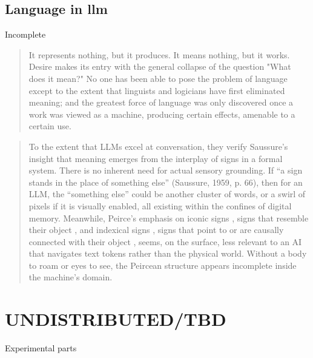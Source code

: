 \subsection{Language in \Gls{llm} }
\begin{orangebox}
	Incomplete
\end{orangebox}




\begin{quote}
	It represents nothing, but it produces. It means nothing, but it works.
	Desire makes its entry with the general collapse of the question "What does
	it mean?" No one has been able to pose the problem of language except to the
	extent that linguists and logicians have first eliminated meaning; and the
	greatest force of language was only discovered once a work was viewed as a
	machine, producing certain effects, amenable to a certain use.
	\cite[109]{deleuze1983}
\end{quote}


\begin{quote}
	To the extent that LLMs excel at conversation, they verify Saussure’s insight that meaning emerges from the interplay of signs in a formal system. There is no inherent need for actual sensory grounding. If “a sign stands in the place of something else” (Saussure, 1959, p. 66), then for an LLM, the “something else” could be another cluster of words, or a swirl of pixels if it is visually enabled, all existing within the confines of digital memory. Meanwhile, Peirce’s emphasis on iconic signs , signs that resemble their object , and indexical signs , signs that point to or are causally connected with their object , seems, on the surface, less relevant to an AI that navigates text tokens rather than the physical world. Without a body to roam or eyes to see, the Peircean structure appears incomplete inside the machine’s domain.
	\parencite{filimowicz2025}
\end{quote}


\section{UNDISTRIBUTED/TBD}

\begin{orangebox}
	Experimental parts
\end{orangebox}


